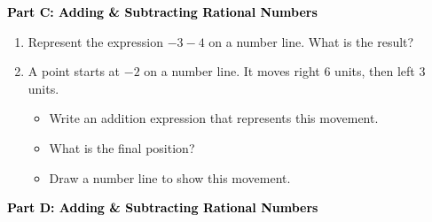 \documentclass[12pt, letterpaper, fleqn]{article}
\begin{document}
\newpage

\begin{tcolorbox}[colback=customteal!20]
\large\textcolor{black}{\textbf{Part C: Adding \& Subtracting Rational Numbers}}
\end{tcolorbox}

\vspace{3mm}

\begin{enumerate}[itemsep=5.5cm, leftmargin=0.6cm, resume]
\item Represent the expression $-3 - 4$ on a number line. What is the result?
\vspace{2.5cm}
\item A point starts at $-2$ on a number line. It moves right $6$ units, then left $3$ units.
    \begin{itemize}
\item Write an addition expression that represents this movement.
\item What is the final position?
\item Draw a number line to show this movement.
    \end{itemize}
\vspace{3.5cm}
\end{enumerate}

\newpage

\begin{tcolorbox}[colback=customteal!20]
\large\textcolor{black}{\textbf{Part D: Adding \& Subtracting Rational Numbers}}
\end{tcolorbox}

\vspace{3mm}
\end{document}
